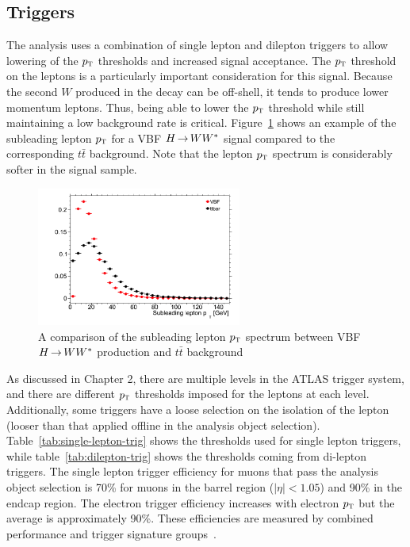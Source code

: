 \subsection{Triggers}
\label{sec:HWWtrigger}

The analysis uses a combination of single lepton and dilepton triggers to allow lowering of the $p_{\textrm{\footnotesize\sc t}}$ thresholds and increased signal acceptance. The $p_{\textrm{\footnotesize\sc t}}$ threshold on the leptons is a particularly important consideration for this signal. Because the second $W$ produced in the decay can be off-shell, it tends to produce lower momentum leptons. Thus, being able to lower the $p_{\textrm{\footnotesize\sc t}}$ threshold while still maintaining a low background rate is critical. Figure~\ref{fig:leptonpt} shows an example of the subleading lepton $p_{\textrm{\footnotesize\sc t}}$ for a VBF $H{\,{\rightarrow}\,}WW^\ast$ signal compared to the corresponding $t\bar{t}$ background. Note that the lepton $p_{\textrm{\footnotesize\sc t}}$ spectrum is considerably softer in the signal sample. 

\begin{figure}[h!]
  \centering
  \captionsetup{justification=centering}

  \includegraphics[width=0.6\textwidth]{figures/lepton_pt}
  \caption{A comparison of the subleading lepton $p_{\textrm{\footnotesize\sc t}}$ spectrum between VBF $H{\,{\rightarrow}\,}WW^\ast$ production and $t\bar{t}$ background}
  \label{fig:leptonpt}
\end{figure}

As discussed in Chapter 2, there are multiple levels in the ATLAS trigger system, and there are different $p_{\textrm{\footnotesize\sc t}}$ thresholds imposed for the leptons at each level. Additionally, some triggers have a loose selection on the isolation of the lepton (looser than that applied offline in the analysis object selection). Table~\ref{tab:single-lepton-trig} shows the thresholds used for single lepton triggers, while table~\ref{tab:dilepton-trig} shows the thresholds coming from di-lepton triggers. The single lepton trigger efficiency for muons that pass the analysis object selection is 70\% for muons in the barrel region ($|\eta| < 1.05$) and 90\% in the endcap region. The electron trigger efficiency increases with electron $p_{\textrm{\footnotesize\sc t}}$ but the average is approximately 90\%. These efficiencies are measured by combined performance and trigger signature groups~\cite{MuonTrigger2012,ElectronTrigger2012}.

